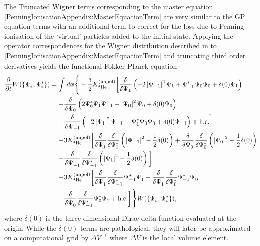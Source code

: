 The Truncated Wigner terms corresponding to the master equation \eqref{PenningIonisationAppendix:MasterEquationTerm} are very similar to the GP equation terms with an additional term to correct for the loss due to Penning ionisation of the `virtual' particles added to the initial state. Applying the operator correspondences for the Wigner distribution described in  to \eqref{PenningIonisationAppendix:MasterEquationTerm} and truncating third order derivatives yields the functional Fokker-Planck equation
\begin{align}
    \begin{split}
    \frac{\partial}{\partial t} W(\left\{ \Psi_i^{\phantom{*}}, \Psi_i^*\right\}) &= \int d \bm{x} \Bigg\{ -\frac{3}{2}\Kunpol\bigg[\frac{\delta}{\delta \Psi_1}\left(-2 \abs{\Psi_{-1}}^2\Psi_1 +\Psi_{-1}^*\Psi_0\Psi_0  + \delta(0) \Psi_1\right)\\
    &\relphantom{=} +\frac{\delta}{\delta \Psi_0}\left(2 \Psi_0^* \Psi_1 \Psi_{-1}  - \abs{\Psi_0}^2 \Psi_0 + \delta(0) \Psi_0\right)\\
    &\relphantom{=} +\frac{\delta}{\delta \Psi_{-1}}\left(- 2 \abs{\Psi_1}^2 \Psi_{-1} + \Psi_1^* \Psi_0 \Psi_0  + \delta(0) \Psi_{-1}\right) + \text{h.c.} \bigg]\\
    &\relphantom{=} + 3 \Kunpol \bigg[\frac{\delta}{\delta \Psi_1^{\phantom{*}}} \frac{\delta}{\delta \Psi_1^*}\left(\abs{\Psi_{-1}}^2 - \frac{1}{2} \delta(0)\right) + \frac{\delta}{\delta \Psi_0^{\phantom{*}}} \frac{\delta}{\delta \Psi_0^*}\left(\abs{\Psi_0}^2 - \frac{1}{2} \delta(0)\right) \\
    &\relphantom{=} + \frac{\delta}{\delta \Psi_{-1}^{\phantom{*}}} \frac{\delta}{\delta \Psi_{-1}^*} \left(\abs{\Psi_1}^2 - \frac{1}{2}\delta(0)\right)\bigg] \\
    &\relphantom{=} +3 \Kunpol\bigg[\frac{\delta}{\delta \Psi_1^{\phantom{*}}}\frac{\delta}{\delta \Psi_{-1}^*}\Psi_{-1}^*\Psi_{1}^{\phantom{*}}  - \frac{\delta}{\delta \Psi_{1}^{\phantom{*}}}\frac{\delta}{\delta \Psi_0^*}\Psi_{-1}^* \Psi_0^{\phantom{*}} \\
    &\relphantom{=} - \frac{\delta}{\delta \Psi_0^{\phantom{*}}}\frac{\delta}{\delta \Psi_{-1}^*} \Psi_0^* \Psi_1^{\phantom{*}} + \text{h.c.} \bigg]\Bigg\}W(\left\{\Psi_i^{\phantom{*}}, \Psi_i^* \right\}),
    \end{split}
    \label{PenningIonisationAppendix:FunctionalFokkerPlanckEquation}
\end{align}
where $\delta(0)$ is the three-dimensional Dirac delta function evaluated at the origin. While the $\delta(0)$ terms are pathological, they will later be approximated on a computational grid by $\Delta V^{-1}$ where $\Delta V$ is the local volume element.

